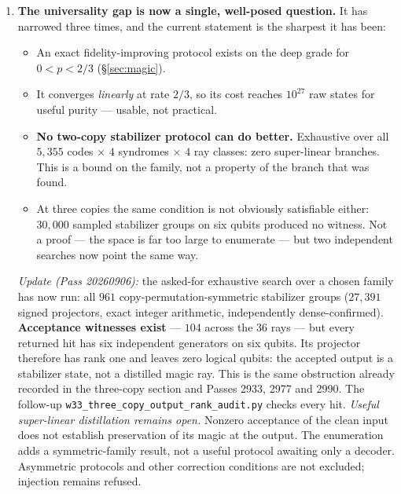 \documentclass[11pt,a4paper]{article}
\begin{document}
\begin{enumerate}[leftmargin=*,itemsep=4pt]
\item \textbf{The universality gap is now a single, well-posed question.} It has narrowed
      three times, and the current statement is the sharpest it has been:
      \begin{itemize}[leftmargin=1.2em,itemsep=1pt,topsep=2pt]
      \item An exact fidelity-improving protocol exists on the deep grade for
            $0<p<2/3$ (\S\ref{sec:magic}).
      \item It converges \emph{linearly} at rate $2/3$, so its cost reaches $10^{27}$ raw
            states for useful purity --- usable, not practical.
      \item \textbf{No two-copy stabilizer protocol can do better.} Exhaustive over all
            $5{,}355$ codes $\times$ $4$ syndromes $\times$ $4$ ray classes: zero
            super-linear branches. This is a bound on the family, not a property of the
            branch that was found.
      \item At three copies the same condition is not obviously satisfiable either:
            $30{,}000$ sampled stabilizer groups on six qubits produced no witness. Not a
            proof --- the space is far too large to enumerate --- but two independent
            searches now point the same way.
      \end{itemize}
      \emph{Update (Pass 20260906):} the asked-for exhaustive search over a chosen family
      has now run: all $961$ copy-permutation-symmetric stabilizer groups ($27{,}391$
      signed projectors, exact integer arithmetic, independently dense-confirmed).
      \textbf{Acceptance witnesses exist} --- $104$ across the $36$ rays --- but
      every returned hit has six independent generators on six qubits. Its
      projector therefore has rank one and leaves zero logical qubits: the
      accepted output is a stabilizer state, not a distilled magic ray.
      This is the same obstruction already recorded in the three-copy section
      and Passes 2933, 2977 and 2990. The follow-up
      \texttt{w33\_three\_copy\_output\_rank\_audit.py} checks every hit.
      \emph{Useful super-linear distillation remains open.} Nonzero acceptance
      of the clean input does not establish preservation of its magic at the
      output. The enumeration adds a symmetric-family result, not a useful
      protocol awaiting only a decoder. Asymmetric protocols and other
      correction conditions are not excluded; injection remains refused.


\end{enumerate}
\end{document}

